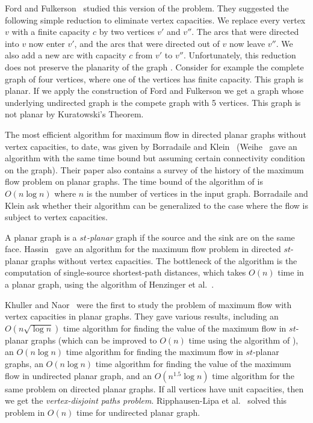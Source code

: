 \documentclass[a4paper,11pt]{article}
\begin{document}
Ford and Fulkerson~\cite[Chapter I.11]{FF62} studied this version of
the problem. They suggested the following simple reduction to
eliminate vertex capacities. We replace every vertex $v$ with a
finite capacity $c$ by two vertices $v'$ and $v''$. The arcs that were
directed into $v$ now enter $v'$, and the arcs that were directed out of
$v$ now leave $v''$. We also add a new arc with capacity $c$ from
$v'$ to $v''$. Unfortunately, this reduction does not preserve the
planarity of the graph \cite{KN94}. Consider for example the
complete graph of four vertices, where one of the vertices has
finite capacity. This graph is planar. If we apply the construction
of Ford and Fulkerson we get a graph whose underlying undirected graph
is the compete graph with 5 vertices. This graph
is not planar by Kuratowski's Theorem.

The most efficient algorithm for  maximum flow in directed planar
graphs without vertex capacities, to date, was given by Borradaile
and Klein~\cite{BK} (Weihe~\cite{W97} gave an  algorithm with the
same time bound but assuming  certain connectivity condition on the
graph). Their paper also contains a survey of the history of the
maximum flow problem on planar graphs. The time bound of the
algorithm of \cite{BK} is $O(n\log n)$ where $n$ is the number of
vertices in the input graph. Borradaile and Klein ask whether their
algorithm can be generalized to the case where the flow is subject
to vertex capacities.

A planar  graph is a \emph{$st$-planar} graph if the source and the
sink are on the same face. Hassin~\cite{H81} gave an algorithm for
the maximum flow problem in directed $st$-planar graphs without
vertex capacities. The bottleneck of the algorithm is the
computation of single-source shortest-path distances, which takes
$O(n)$ time in a planar graph, using the algorithm of Henzinger et
al.~\cite{HKRS97}.

 Khuller and Naor~\cite{KN94} were the first to study the  problem of maximum flow with vertex
capacities in planar graphs. They gave various results, including an
$O(n\sqrt{\log n})$ time algorithm for finding the value of the
maximum flow in $st$-planar graphs (which can be improved to $O(n)$
time using the algorithm of \cite{HKRS97}), an $O(n\log n)$ time
algorithm for finding the maximum flow in $st$-planar graphs, an
$O(n\log n)$ time algorithm for finding the value of the maximum
flow in undirected planar graph, and an $O(n^{1.5}\log n)$ time
algorithm for the same problem on directed planar graphs. If all
vertices have unit capacities, then we get the \emph{vertex-disjoint
paths problem}. Ripphausen-Lipa et al.~\cite{RLW97} solved this
problem in $O(n)$ time for undirected planar graph.
\end{document}
